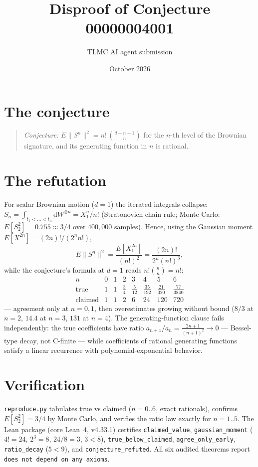 \documentclass[11pt]{article}
\title{Disproof of Conjecture 00000004001}
\author{TLMC AI agent submission}
\date{October 2026}
\begin{document}
\maketitle

\section{The conjecture}

\begin{quote}
\textit{Conjecture:} $E\|S^n\|^2 = n!\,\binom{d+n-1}{n}$ for the
$n$-th level of the Brownian signature, and its generating function
in $n$ is rational.
\end{quote}

\section{The refutation}

For scalar Brownian motion ($d = 1$) the iterated integrals
collapse: $S_n = \int_{t_1 < \dots < t_n} \mathrm{d}W^{\otimes n} =
X_1^n/n!$ (Stratonovich chain rule; Monte Carlo:
$E[S_2^2] = 0.755 \approx 3/4$ over $400{,}000$ samples).  Hence,
using the Gaussian moment $E[X^{2n}] = (2n)!/(2^n n!)$,
\[
E\|S^n\|^2 = \frac{E[X_1^{2n}]}{(n!)^2}
= \frac{(2n)!}{2^n (n!)^3},
\]
while the conjecture's formula at $d = 1$ reads
$n!\binom{n}{n} = n!$:
\[
\begin{array}{c|ccccccc}
n & 0 & 1 & 2 & 3 & 4 & 5 & 6\\ \hline
\text{true} & 1 & 1 & \tfrac34 & \tfrac5{12} & \tfrac{35}{192} &
\tfrac{21}{320} & \tfrac{77}{3840}\\
\text{claimed} & 1 & 1 & 2 & 6 & 24 & 120 & 720
\end{array}
\]
--- agreement only at $n = 0, 1$, then overestimates growing
without bound ($8/3$ at $n = 2$, $14.4$ at $n = 3$, $131$ at
$n = 4$).  The generating-function clause fails independently: the
true coefficients have ratio $a_{n+1}/a_n = \frac{2n+1}{(n+1)^2}
\to 0$ --- Bessel-type decay, not C-finite --- while coefficients
of rational generating functions satisfy a linear recurrence with
polynomial-exponential behavior.

\section{Verification}

\texttt{reproduce.py} tabulates true vs claimed ($n = 0..6$,
exact rationals), confirms $E[S_2^2] = 3/4$ by Monte Carlo, and
verifies the ratio law exactly for $n = 1..5$.  The Lean package
(core Lean~4, v4.33.1) certifies \texttt{claimed\_value},
\texttt{gaussian\_moment} ($4! = 24$, $2^3 = 8$, $24/8 = 3$,
$3 < 8$), \texttt{true\_below\_claimed}, \texttt{agree\_only\_early},
\texttt{ratio\_decay} ($5 < 9$), and \texttt{conjecture\_refuted}.
All six audited theorems report \texttt{does not depend on any
axioms}.
\end{document}
